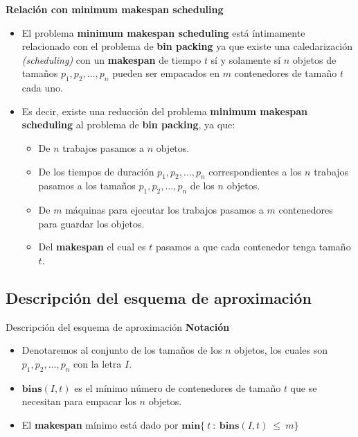 \begin{frame}{\subsectiontitle}
    \textbf{Relación con minimum makespan scheduling}
    \begin{itemize}
        \item El problema \textbf{minimum makespan scheduling} está íntimamente relacionado con el problema de \textbf{bin packing} ya que existe una caledarización \textit{(scheduling)} con un \textbf{makespan} de tiempo \(t\) sí y solamente sí \(n\) objetos de tamaños 
        \(p_{1}, p_{2}, \dotsc, p_{n}\) pueden ser empacados en \(m\) contenedores de tamaño \(t\) cada uno. 
        \item Es decir, existe una 
        reducción del problema \textbf{minimum makespan scheduling} al problema de \textbf{bin packing}, ya que:
        \begin{itemize}
            \item De \(n\) trabajos pasamos a \(n\) objetos.
            \item De los tiempos de duración \(p_{1}, p_{2}, \dotsc, p_{n}\) correspondientes a los \(n\) trabajos pasamos a los 
            tamaños \(p_{1}, p_{2}, \dotsc, p_{n}\) de los \(n\) objetos.
            \item De \(m\) máquinas para ejecutar los trabajos pasamos a \(m\) contenedores para guardar los objetos.
            \item Del \textbf{makespan} el cual es \(t\) pasamos a que cada contenedor tenga tamaño \(t\).
        \end{itemize}
            \end{itemize}
\end{frame}

\renewcommand{\subsectiontitle}{Descripción del esquema de aproximación}
\subsection{\subsectiontitle}

\begin{frame}{\subsectiontitle}
    \textbf{Notación}
    \begin{itemize}
    \item Denotaremos al conjunto de los tamaños de los \(n\) objetos, los cuales son \(p_{1}, p_{2}, \dotsc, p_{n}\) 
    con la letra \(I\).
    \item \(\mathbf{bins}\left(I,t\right)\) es el mínimo número de contenedores de tamaño \(t\) que se necesitan 
    para empacar los \(n\) objetos.
    \item El \textbf{makespan} mínimo está dado por \(\mathbf{min}\{ \ t \ : \ \mathbf{bins}\left(I, t\right) \ \leq \ m\}\)
\end{itemize}
\end{frame}

